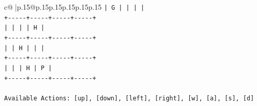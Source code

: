 \documentclass{article}
\begin{document}
{\begin{supertabular}{c@{$\;$}|p{.15\linewidth}@{}p{.15\linewidth}p{.15\linewidth}p{.15\linewidth}p{.15\linewidth}p{.15\linewidth}}
{{{\texttt{|  G  |     |     |     |} \\
\texttt{+{-}{-}{-}{-}{-}+{-}{-}{-}{-}{-}+{-}{-}{-}{-}{-}+{-}{-}{-}{-}{-}+} \\
\texttt{|     |     |     |  H  |} \\
\texttt{+{-}{-}{-}{-}{-}+{-}{-}{-}{-}{-}+{-}{-}{-}{-}{-}+{-}{-}{-}{-}{-}+} \\
\texttt{|     |  H  |     |     |} \\
\texttt{+{-}{-}{-}{-}{-}+{-}{-}{-}{-}{-}+{-}{-}{-}{-}{-}+{-}{-}{-}{-}{-}+} \\
\texttt{|     |     |  H  |  P  |} \\
\texttt{+{-}{-}{-}{-}{-}+{-}{-}{-}{-}{-}+{-}{-}{-}{-}{-}+{-}{-}{-}{-}{-}+} \\
\\ 
\texttt{Available Actions: {[}up{]}, {[}down{]}, {[}left{]}, {[}right{]}, {[}w{]}, {[}a{]}, {[}s{]}, {[}d{]}} \\
            }
        }
    }
     \\ \\


\end{supertabular}}
\end{document}

